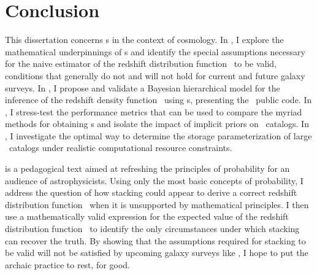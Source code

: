 \chapter*{Conclusion}

This dissertation concerns \pzpdf s in the context of cosmology.
In , I explore the mathematical underpinnings of \pzpdf s and identify the special assumptions necessary for the naive estimator of the redshift distribution function \Nz\ to be valid, conditions that generally do not and will not hold for current and future galaxy surveys.
In , I propose and validate a Bayesian hierarchical model for the inference of the redshift density function \nz\ using \pzpdf s, presenting the \chippr\ public code.
In , I stress-test the performance metrics that can be used to compare the myriad methods for obtaining \pzpdf s and isolate the impact of implicit priors on \pzpdf\ catalogs.
In , I investigate the optimal way to determine the storage parameterization of large \pzpdf\ catalogs under realistic computational resource constraints. 


 is a pedagogical text aimed at refreshing the principles of probability for an audience of astrophysicists.
Using only the most basic concepts of probability, I address the question of how stacking could appear to derive a correct redshift distribution function \Nz\ when it is unsupported by mathematical principles.
I then use a mathematically valid expression for the expected value of the redshift distribution function \Nz\ to identify the only circumstances under which stacking can recover the truth.
By showing that the assumptions required for stacking to be valid will not be satisfied by upcoming galaxy surveys like \lsst, I hope to put the archaic practice to rest, for good.


